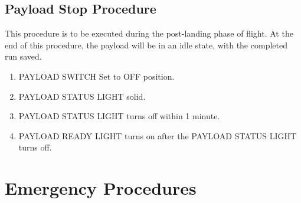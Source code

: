 \documentclass{report}
\begin{document}
	\section{Payload Stop Procedure}
		This procedure is to be executed during the post-landing phase of flight.  At the end of this procedure, the payload will be in an idle state, with the completed run saved.
		\begin{enumerate}
			\item PAYLOAD SWITCH \hrulefill Set to OFF position.
			\item PAYLOAD STATUS LIGHT \hrulefill solid.
			\item PAYLOAD STATUS LIGHT \hrulefill turns off within 1 minute.
			\item PAYLOAD READY LIGHT \hrulefill turns on after the PAYLOAD STATUS LIGHT turns off.
		\end{enumerate}
\chapter{Emergency Procedures}
\end{document}
